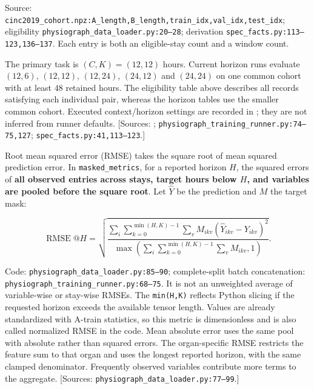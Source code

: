 Source: \texttt{cinc2019\_\allowbreak{}cohort.\allowbreak{}npz:\allowbreak{}A\_\allowbreak{}length,\allowbreak{}B\_\allowbreak{}length,\allowbreak{}train\_\allowbreak{}idx,\allowbreak{}val\_\allowbreak{}idx,\allowbreak{}test\_\allowbreak{}idx}; eligibility \texttt{physiograph\_\allowbreak{}data\_\allowbreak{}loader.\allowbreak{}py:\allowbreak{}20–\allowbreak{}28}; derivation \texttt{spec\_\allowbreak{}facts.\allowbreak{}py:\allowbreak{}113–\allowbreak{}123,\allowbreak{}136–\allowbreak{}137}. Each entry is both an eligible-stay count and a window count.

The primary task is $(C,K)=(12,12)$ hours. Current horizon runs evaluate $(12,6)$, $(12,12)$, $(12,24)$, $(24,12)$ and $(24,24)$ on one common cohort with at least $48$ retained hours. The eligibility table above describes all records satisfying each individual pair, whereas the horizon tables use the smaller common cohort. Executed context/horizon settings are recorded in ; they are not inferred from runner defaults. [Sources: ; \texttt{physiograph\_\allowbreak{}training\_\allowbreak{}runner.\allowbreak{}py:\allowbreak{}74–\allowbreak{}75,\allowbreak{}127}; \texttt{spec\_\allowbreak{}facts.\allowbreak{}py:\allowbreak{}41,\allowbreak{}113–\allowbreak{}123}.]

Root mean squared error (RMSE) takes the square root of mean squared prediction error. In \texttt{masked\_\allowbreak{}metrics}, for a reported horizon \(H\), the squared errors of \textbf{all observed entries across stays, target hours below \(H\), and variables are pooled before the square root}. Let \(\widehat Y\) be the prediction and \(M\) the target mask:

\[
\operatorname{RMSE}@H=
\sqrt{\frac{\sum_i\sum_{k=0}^{\min(H,K)-1}\sum_v
 M_{ikv}(\widehat Y_{ikv}-Y_{ikv})^2}
 {\max\!\left(\sum_i\sum_{k=0}^{\min(H,K)-1}\sum_v M_{ikv},1\right)}}.
\]


Code: \texttt{physiograph\_\allowbreak{}data\_\allowbreak{}loader.\allowbreak{}py:\allowbreak{}85–\allowbreak{}90}; complete-split batch concatenation: \texttt{physiograph\_\allowbreak{}training\_\allowbreak{}runner.\allowbreak{}py:\allowbreak{}68–\allowbreak{}75}. It is not an unweighted average of variable-wise or stay-wise RMSEs. The \texttt{min(H,\allowbreak{}K)} reflects Python slicing if the requested horizon exceeds the available tensor length. Values are already standardized with A-train statistics, so this metric is dimensionless and is also called normalized RMSE in the code. Mean absolute error uses the same pool with absolute rather than squared errors. The organ-specific RMSE restricts the feature sum to that organ and uses the longest reported horizon, with the same clamped denominator. Frequently observed variables contribute more terms to the aggregate. [Sources: \texttt{physiograph\_\allowbreak{}data\_\allowbreak{}loader.\allowbreak{}py:\allowbreak{}77–\allowbreak{}99}.]

